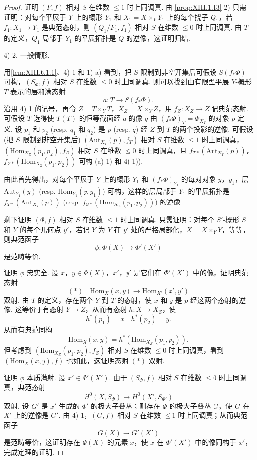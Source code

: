 \begin{proof}
证明 $(F, f)$ 相对 $S$ 在维数 $\leqslant 1$ 时上同调真. 由 \ref{prop:XIII.1.13} 2) 只需证明：对每个平展于 $Y$ 上的概形 $Y_1$ 和 $X_1 = X \times_Y Y_1$ 上的每个挠子 $Q_1$，若 $f_1 \colon X_1 \to Y_1$ 是典范态射，则 $(Q_1/F_1, f_1)$ 相对 $S$ 在维数 $\leqslant 0$ 时上同调真. 由 $T$ 的定义，$Q_1$ 局部于 $Y_1$ 的平展拓扑是 $Q$ 的逆像，这证明归结.

4) 2. 一般情形.

用\cref{lem:XIII.6.1.1}、4) 1 和 1) a) 看到，把 $S$ 限制到非空开集后可假设 $S(f_* \Phi)$ 可构，$(S_\Phi, f)$ 相对 $S$ 在维数 $\leqslant 0$ 时上同调真. 则可以找到由有限型平展 $Y$-概形 $T$ 表示的层和满态射
\[
a \colon T \longrightarrow S(f_* \Phi).
\]
沿用 4) 1 的记号，再令 $Z = T \times_Y T$，$X_Z = X \times_Y Z$，用 $f_Z \colon X_Z \to Z$ 记典范态射. 可假设 $T$ 选得使 $T(T)$ 的恒等截面经 $a$ 的像 $q$ 由 $(f_* \Phi)_T = \Phi_{X_T}$ 的对象 $p$ 定义. 设 $p_1$ 和 $p_2$ (resp. $q_1$ 和 $q_2$) 是 $p$ (resp. $q$) 经 $Z$ 到 $T$ 的两个投影的逆像. 可假设 (把 $S$ 限制到非空开集后) $(\mathrm{Aut}_{X_T}(p), f_T)$ 相对 $S$ 在维数 $\leqslant 1$ 时上同调真，$(\mathrm{Hom}_{X_Z}(p_1, p_2), f_Z)$ 相对 $S$ 在维数 $\leqslant 0$ 时上同调真，且 $f_{T*}(\mathrm{Aut}_{X_T}(p))$，$f_{Z*}(\mathrm{Hom}_{X_Z}(p_1, p_2))$ 可构 (a) 1) 和 4) 1)).

由此首先得出，对每个平展于 $Y$ 上的概形 $Y_1$ 和 $(f_* \Phi)_{Y_1}$ 的每对对象 $y$，$y_1$，层 $\mathrm{Aut}_{Y_1}(y)$ (resp. $\mathrm{Hom}_{Y_1}(y, y_1)$) 可构，这样的层局部于 $Y_1$ 的平展拓扑是 $f_{T*}(\mathrm{Aut}_{X_T}(p))$ (resp. $f_{Z*}(\mathrm{Hom}_{X_Z}(p_1, p_2))$) 的逆像.

剩下证明 $(\Phi, f)$ 相对 $S$ 在维数 $\leqslant 1$ 时上同调真. 只需证明：对每个 $S'$-概形 $S$ 和 $Y$ 的每个几何点 $y'$，若记 $Y$ 为 $Y$ 在 $y'$ 处的严格局部化，$X = X \times_Y Y$，等等，则典范函子
\[
\phi \colon \Phi(X) \longrightarrow \Phi'(X')
\]
是范畴等价.

证明 $\phi$ 忠实全. 设 $x$，$y \in \Phi(X)$，$x'$，$y'$ 是它们在 $\Phi'(X')$ 中的像，证明典范态射
\[
(\ast) \quad \mathrm{Hom}_X(x, y) \longrightarrow \mathrm{Hom}_{X'}(x', y')
\]
双射. 由 $T$ 的定义，存在两个 $Y$ 到 $T$ 的态射，使 $x$ 和 $y$ 是 $p$ 经这两个态射的逆像. 这等价于有态射 $Y \to Z$，从而有态射 $h \colon X \to X_Z$，使
\[
h^{*}(p_1) = x \quad h^{*}(p_2) = y.
\]
从而有典范同构
\[
\mathrm{Hom}_X(x, y) = h^{*}(\mathrm{Hom}_{X_Z}(p_1, p_2)).
\]
但考虑到 $(\mathrm{Hom}_{X_Z}(p_1, p_2), f_Z)$ 相对 $S$ 在维数 $\leqslant 0$ 时上同调真，看到 $(\mathrm{Hom}_X(x, y), f)$ 也如此，这证明态射 $(\ast)$ 双射.

证明 $\phi$ 本质满射. 设 $x' \in \Phi'(X')$. 由于 $(S_\Phi, f)$ 相对 $S$ 在维数 $\leqslant 0$ 时上同调真，典范态射
\[
H^0(X, S_\Phi) \longrightarrow H^0(X', S_{\Phi'})
\]
双射. 设 $G'$ 是 $x'$ 生成的 $\Phi'$ 的极大子叠丛；则存在 $\Phi$ 的极大子叠丛 $G$，使 $G$ 在 $X'$ 上的逆像是 $G'$. 由 4) 1，$(G, f)$ 相对 $S$ 在维数 $\leqslant 1$ 时上同调真；从而典范函子
\[
G(X) \longrightarrow G'(X')
\]
是范畴等价，这证明存在 $\Phi(X)$ 的元素 $x$，使 $x$ 在 $\Phi'(X')$ 中的像同构于 $x'$，完成定理的证明.
\end{proof}

